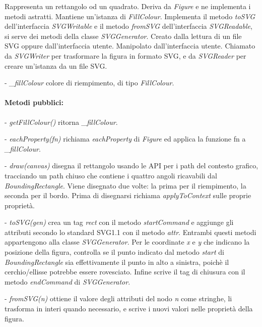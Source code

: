 Rappresenta un rettangolo od un quadrato.
Deriva da \textit{Figure} e ne implementa i metodi astratti. Mantiene un'istanza di \textit{FillColour}. Implementa il metodo \textit{toSVG} dell'interfaccia \textit{SVGWritable} e il metodo \textit{fromSVG} dell'interfaccia \textit{SVGReadable}, si serve dei metodi della classe \textit{SVGGenerator}.
Creato dalla lettura di un file SVG oppure dall'interfaccia utente. Manipolato dall'interfaccia utente. Chiamato da \textit{SVGWriter} per trasformare la figura in formato SVG, e da \textit{SVGReader} per creare un'istanza da un file SVG.
\begin{elencopuntato}[\subsubsecindent]
\item[-] \textit{{\_}fillColour} colore di riempimento, di tipo \textit{FillColour}.
\end{elencopuntato}
\paragraph{Metodi pubblici:}
\begin{elencopuntato}[\subsubsecindent]
\item[-] \textit{getFillColour()} ritorna \textit{{\_}fillColour}.
\item[-] \textit{eachProperty(fn)} richiama \textit{eachProperty} di \textit{Figure} ed applica la funzione fn a \textit{{\_}fillColour}.
\item[-] \textit{draw(canvas)} disegna il rettangolo usando le API per i path del contesto grafico, tracciando un path chiuso che contiene i quattro angoli ricavabili dal \textit{BoundingRectangle}. Viene disegnato due volte: la prima per il riempimento, la seconda per il bordo. Prima di disegnarsi richiama \textit{applyToContext} sulle proprie propriet\`a.
\item[-] \textit{toSVG(gen)} crea un tag \textit{rect} con il metodo \textit{startCommand} e aggiunge gli attributi secondo lo standard SVG1.1 con il metodo \textit{attr}. Entrambi questi metodi appartengono alla classe \textit{SVGGenerator}. Per le coordinate \textit{x} e \textit{y} che indicano la posizione della figura, controlla se il punto indicato dal metodo \textit{start} di \textit{BoundingRectangle} sia effettivamente il punto in alto a sinistra, poich\`e il cerchio/ellisse potrebbe essere rovesciato. Infine scrive il tag di chiusura con il metodo \textit{endCommand} di \textit{SVGGenerator}.
\item[-] \textit{fromSVG(n)} ottiene il valore degli attributi del nodo \textit{n} come stringhe, li trasforma in interi quando necessario, e scrive i nuovi valori nelle propriet\`a della figura. 
\end{elencopuntato}

